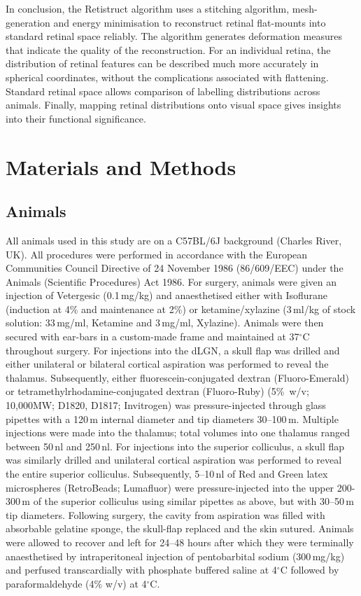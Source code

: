 \documentclass[10pt]{article}
\begin{document}
In conclusion, the Retistruct algorithm uses a stitching algorithm,
mesh-generation and energy minimisation to reconstruct retinal
flat-mounts into standard retinal space reliably. The algorithm
generates deformation measures that indicate the quality of the
reconstruction. For an individual retina, the distribution of retinal
features can be described much more accurately in spherical
coordinates, without the complications associated with flattening.
Standard retinal space allows comparison of labelling distributions
across animals. Finally, mapping retinal distributions onto visual
space gives insights into their functional significance.

\subsection*{}
\section*{Materials and Methods}
\subsection*{Animals}
All animals used in this study are on a C57BL/6J background (Charles
River, UK). All procedures were performed in accordance with the
European Communities Council Directive of 24 November 1986
(86/609/EEC) under the Animals (Scientific Procedures) Act 1986. For
surgery, animals were given an injection of Vetergesic (0.1\,mg/kg)
and anaesthetised either with Isoflurane (induction at 4\% and
maintenance at 2\%) or ketamine/xylazine (3\,ml/kg of stock solution:
33\,mg/ml, Ketamine and 3\,mg/ml, Xylazine). Animals were then secured
with ear-bars in a custom-made frame and maintained at 37$^{\circ}$C
throughout surgery. For injections into the dLGN, a skull flap was
drilled and either unilateral or bilateral cortical aspiration was
performed to reveal the thalamus. Subsequently, either
fluorescein-conjugated dextran (Fluoro-Emerald) or
tetramethylrhodamine-conjugated dextran (Fluoro-Ruby) (5\%~w/v;
10,000MW; D1820, D1817; Invitrogen) was pressure-injected through
glass pipettes with a 120\,{\textmu}m internal diameter and tip
diameters 30{}--100\,{\textmu}m. Multiple injections were made into
the thalamus; total volumes into one thalamus ranged between 50\,nl
and 250\,nl.  For injections into the superior colliculus, a skull
flap was similarly drilled and unilateral cortical aspiration was
performed to reveal the entire superior colliculus. Subsequently,
5{}--10\,nl of Red and Green latex microspheres (RetroBeads;
Lumafluor) were pressure-injected into the upper 200-300\,{\textmu}m
of the superior colliculus using similar pipettes as above, but with
30{}--50\,{\textmu}m tip diameters. Following surgery, the cavity from
aspiration was filled with absorbable gelatine sponge, the skull-flap
replaced and the skin sutured. Animals were allowed to recover and
left for 24--48 hours after which they were terminally anaesthetised
by intraperitoneal injection of pentobarbital sodium (300\,mg/kg) and
perfused transcardially with phosphate buffered saline at 4$^{\circ}$C
followed by paraformaldehyde (4\% w/v) at 4$^{\circ}$C.
\end{document}
